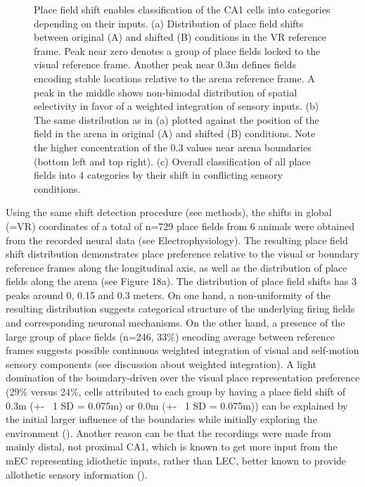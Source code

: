 \begin{figure}
\captionsetup{format=plain}
\caption[Place field shift distribution in conflict]{
Place field shift enables classification of the CA1 cells into categories depending on their inputs. (a) Distribution of place field shifts between original (A) and shifted (B) conditions in the VR reference frame. Peak near zero denotes a group of place fields locked to the visual reference frame. Another peak near 0.3m defines fields encoding stable locations relative to the arena reference frame. A peak in the middle shows non-bimodal distribution of spatial selectivity in favor of a weighted integration of sensory inputs. (b) The same distribution as in (a) plotted against the position of the field in the arena in original (A) and shifted (B) conditions. Note the higher concentration of the 0.3 values near arena boundaries (bottom left and top right). (c) Overall classification of all place fields into 4 categories by their shift in conflicting sensory conditions.
}
\label{fig:F18_shift_distribution}
\end{figure}

Using the same shift detection procedure (see methods), the shifts in global (=VR) coordinates of a total of n=729 place fields from 6 animals were obtained from the recorded neural data (see Electrophysiology). The resulting place field shift distribution demonstrates place preference relative to the visual or boundary reference frames along the longitudinal axis, as well as the distribution of place fields along the arena (see Figure 18a). The distribution of place field shifts has 3 peaks around 0, 0.15 and 0.3 meters. On one hand, a non-uniformity of the resulting distribution suggests categorical structure of the underlying firing fields and corresponding neuronal mechanisms. On the other hand, a presence of the large group of place fields (n=246, 33\%) encoding average between reference frames suggests possible continuous weighted integration of visual and self-motion sensory components (see discussion about weighted integration).
A light domination of the boundary-driven over the visual place representation preference (29\% versus 24\%, cells attributed to each group by having a place field shift of 0.3m (+- ~1 SD = 0.075m) or 0.0m (+- ~1 SD = 0.075m)) can be explained by the initial larger influence of the boundaries while initially exploring the environment (\cite{Keinath2018}). Another reason can be that the recordings were made from mainly distal, not proximal CA1, which is known to get more input from the mEC representing idiothetic inputs, rather than LEC, better known to provide allothetic sensory information (\cite{Knierim2014}).

